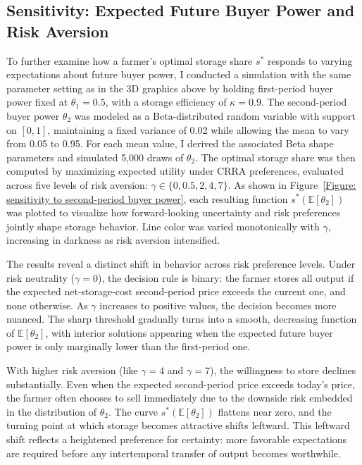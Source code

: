 \subsection{Sensitivity: Expected Future Buyer Power and Risk Aversion}
\noindent To further examine how a farmer's optimal storage share $s^*$ responds to varying expectations about future buyer power, I conducted a simulation with the same parameter setting as in the 3D graphics above by holding first-period buyer power fixed at $\theta_1 = 0.5$, with a storage efficiency of $\kappa = 0.9$. The second-period buyer power $\theta_2$ was modeled as a Beta-distributed random variable with support on $[0, 1]$, maintaining a fixed variance of 0.02 while allowing the mean to vary from 0.05 to 0.95. For each mean value, I derived the associated Beta shape parameters and simulated 5,000 draws of $\theta_2$. The optimal storage share was then computed by maximizing expected utility under CRRA preferences, evaluated across five levels of risk aversion: $\gamma \in \{0, 0.5, 2, 4, 7\}$. As shown in Figure~\ref{Figure: sensitivity to second-period buyer power}, each resulting function $s^*(\mathbb{E}[\theta_2])$ was plotted to visualize how forward-looking uncertainty and risk preferences jointly shape storage behavior. Line color was varied monotonically with $\gamma$, increasing in darkness as risk aversion intensified.

The results reveal a distinct shift in behavior across risk preference levels. Under risk neutrality ($\gamma = 0$), the decision rule is binary: the farmer stores all output if the expected net-storage-cost second-period price exceeds the current one, and none otherwise. As $\gamma$ increases to positive values, the decision becomes more nuanced. The sharp threshold gradually turns into a smooth, decreasing function of $\mathbb{E}[\theta_2]$, with interior solutions appearing when the expected future buyer power is only marginally lower than the first-period one.


With higher risk aversion (like $\gamma = 4$ and $\gamma = 7$), the willingness to store declines substantially. Even when the expected second-period price exceeds today's price, the farmer often chooses to sell immediately due to the downside risk embedded in the distribution of $\theta_2$. The curve $s^*(\mathbb{E}[\theta_2])$ flattens near zero, and the turning point at which storage becomes attractive shifts leftward. This leftward shift reflects a heightened preference for certainty: more favorable expectations are required before any intertemporal transfer of output becomes worthwhile. 


